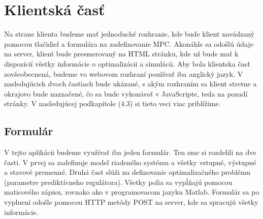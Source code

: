 \section{Klientská časť}
Na strane klienta budeme mať jednoduché rozhranie, kde bude klient navádzaný pomocou tlačidiel a formulára na zadefinovanie MPC. Akonáhle sa odošlú údaje na server, klient bude presmerovaný na HTML stránku, kde už bude mať k dispozícií všetky informácie o optimalizácii a simulácii. Aby bola klientska časť zovšeobecnená, budeme vo webovom rozhraní používať iba anglický jazyk. V nasledujúcich dvoch častiach bude ukázané, s akým rozhraním sa klient stretne a okrajovo bude naznačené, čo sa bude vykonávať v JavaScripte, teda na pozadí stránky. V nasledujúcej podkapitole (4.3) si tieto veci viac priblížime. 
\subsection{Formulár}
\label{subse:Formular}
V tejto aplikácii budeme využívať iba jeden formulár. Ten sme si rozdelili na dve časti. V prvej sa zadefinuje model riadeného systému a všetky vstupné, výstupné a stavové premenné. Druhá čast slúži na definovanie optimalizačného problému (parametre prediktívneho regulátora). Všetky polia sa vypĺňajú pomocou maticového zápisu, rovnako ako v programovacom jazyku Matlab. Formulár sa po vyplnení odošle pomocou HTTP metódy POST na server, kde sa spracujú všetky informácie. 
